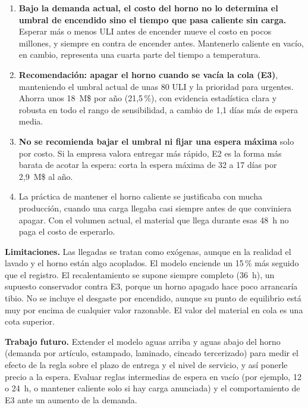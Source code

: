 \documentclass[a4paper,11pt]{article}
\begin{document}
\begin{enumerate}
  \item \textbf{Bajo la demanda actual, el costo del horno no lo determina el umbral de encendido sino el tiempo
        que pasa caliente sin carga.} Esperar más o menos ULI antes de encender mueve el costo en pocos millones,
        y siempre en contra de encender antes. Mantenerlo caliente en vacío, en cambio, representa una cuarta parte del
        tiempo a temperatura.
  \item \textbf{Recomendación: apagar el horno cuando se vacía la cola (E3)}, manteniendo el umbral actual de
        unas 80 ULI y la prioridad para urgentes. Ahorra unos 18~M\$ por año (21,5\,\%), con evidencia
        estadística clara y robusta en todo el rango de sensibilidad, a cambio de 1,1 días más de espera media.
  \item \textbf{No se recomienda bajar el umbral ni fijar una espera máxima} solo por costo. Si la empresa
        valora entregar más rápido, E2 es la forma más barata de acotar la espera: corta la espera máxima de
        32 a 17 días por 2,9~M\$ al año.
  \item La práctica de mantener el horno caliente se justificaba con mucha producción, cuando una carga llegaba
        casi siempre antes de que conviniera apagar. Con el volumen actual, el material que llega durante esas
        48~h no paga el costo de esperarlo.
\end{enumerate}

\textbf{Limitaciones.} Las llegadas se tratan como exógenas, aunque en la realidad el lavado y el horno están
algo acoplados. El modelo enciende un 15\,\% más seguido que el registro. El recalentamiento se supone siempre
completo (36~h), un supuesto conservador contra E3, porque un horno apagado hace poco arrancaría tibio. No se
incluye el desgaste por encendido, aunque su punto de equilibrio está muy por encima de cualquier valor
razonable. El valor del material en cola es una cota superior.

\textbf{Trabajo futuro.} Extender el modelo aguas arriba y aguas abajo del horno (demanda por artículo,
estampado, laminado, cincado tercerizado) para medir el efecto de la regla sobre el plazo de entrega y el nivel
de servicio, y así ponerle precio a la espera. Evaluar reglas intermedias de espera en vacío (por ejemplo, 12 o
24~h, o mantener caliente solo si hay carga anunciada) y el comportamiento de E3 ante un aumento de la demanda.

\end{document}
